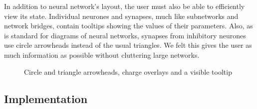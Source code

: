 \documentclass{acm_proc_article-sp}
\begin{document}
{In addition to neural network's layout, the user must also be able to efficiently view its state. Individual neurones and synapses, much like subnetworks and network bridges, contain tooltips showing the values of their parameters. Also, as is standard for diagrams of neural networks, synapses from inhibitory neurones use circle arrowheads instead of the usual triangles. We felt this gives the user as much information as possible without cluttering large networks.

\begin{figure}[t]
\centering
{}
\caption{Circle and triangle arrowheads, charge overlays and a visible tooltip}
\label{fig:ui:special}
\end{figure}
}

\subsection{Implementation}
\end{document}
